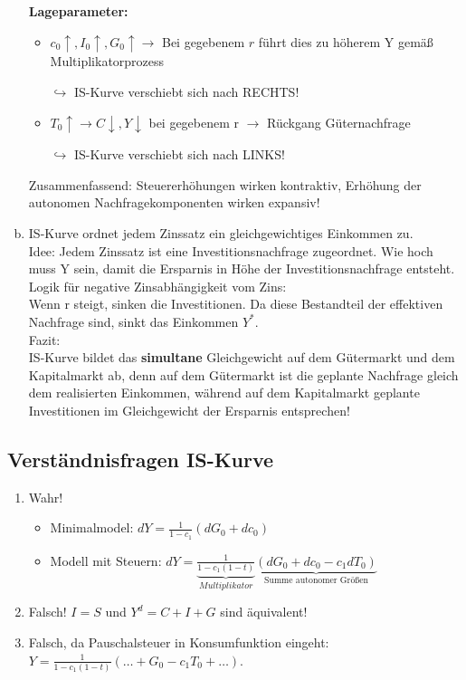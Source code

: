 \documentclass{scrartcl}
\begin{document}
\begin{enumerate}[(a)]
\begin{itemize}
\begin{itemize}
\end{itemize}
\end{itemize}
\textbf{Lageparameter:}
\begin{itemize}
  \item $c_{0} \uparrow, I_{0} \uparrow, G_{0} \uparrow \rightarrow $ Bei gegebenem $r$ f\"{u}hrt dies zu h\"{o}herem Y gem\"{a}{\ss} Multiplikatorprozess
  \item[$\hookrightarrow$] IS-Kurve verschiebt sich nach RECHTS!
  \item $T_{0}\uparrow \rightarrow C\downarrow, Y\downarrow$ bei gegebenem r $\rightarrow$ R\"{u}ckgang G\"{u}ternachfrage
    \item[$\hookrightarrow$] IS-Kurve verschiebt sich nach LINKS!
\end{itemize}
Zusammenfassend: Steuererh\"{o}hungen wirken kontraktiv, Erh\"{o}hung der autonomen Nachfragekomponenten wirken expansiv!

\item
IS-Kurve ordnet jedem Zinssatz ein gleichgewichtiges Einkommen zu.\\
Idee: Jedem Zinssatz ist eine Investitionsnachfrage zugeordnet. Wie hoch muss Y sein, damit die Ersparnis in H\"{o}he der Investitionsnachfrage entsteht.\\
Logik f\"{u}r negative Zinsabh\"{a}ngigkeit vom Zins:\\
Wenn r steigt, sinken die Investitionen. Da diese Bestandteil der effektiven Nachfrage sind, sinkt das Einkommen $Y^*$.\\
Fazit:\\
IS-Kurve bildet das \textbf{simultane} Gleichgewicht auf dem G\"{u}termarkt und dem Kapitalmarkt ab, denn auf dem G\"{u}termarkt ist die geplante Nachfrage gleich dem realisierten Einkommen, w\"{a}hrend auf dem Kapitalmarkt geplante Investitionen im Gleichgewicht der Ersparnis entsprechen!
\end{enumerate}

\subsection{Verst\"{a}ndnisfragen IS-Kurve}
\begin{enumerate}
  \item Wahr!
  \begin{itemize}
  \item Minimalmodel: $d Y = \frac{1}{1-c_1}(d G_{0} + d c_{0})$
  \item Modell mit Steuern: $d Y = \underbrace{\frac{1}{1-c_1(1-t)}}_{Multiplikator}\underbrace{(d G_{0} + d c_{0} - c_1 d T_{0})}_\text{Summe autonomer Gr\"{o}{\ss}en}$
  \end{itemize}
  \item Falsch! $I=S$ und $Y^d=C+I+G$ sind \"{a}quivalent!
  \item Falsch, da Pauschalsteuer in Konsumfunktion eingeht: \\$Y = \frac{1}{1-c_1(1-t)}(\dots+G_{0}-c_1 T_{0}+\dots)$.
\end{enumerate}
\end{document}
